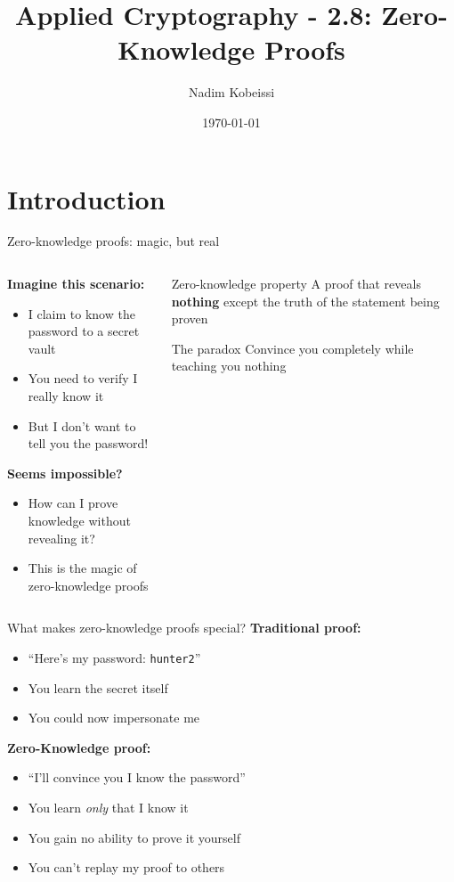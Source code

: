 \documentclass[aspectratio=169, lualatex, handout]{beamer}
\title{Applied Cryptography - 2.8: Zero-Knowledge Proofs}
\author{Nadim Kobeissi}
\institute{American University of Beirut}
\date{\today}
\begin{document}
\begin{frame}[plain]
	\titlepage
\end{frame}

\section{Introduction}

\begin{frame}{Zero-knowledge proofs: magic, but real}
	\begin{columns}[c]
		\begin{column}{0.5\textwidth}
			\textbf{Imagine this scenario:}
			\begin{itemize}
				\item I claim to know the password to a secret vault
				\item You need to verify I really know it
				\item But I don't want to tell you the password!
			\end{itemize}
			\textbf{Seems impossible?}
			\begin{itemize}
				\item How can I prove knowledge without revealing it?
				\item This is the magic of zero-knowledge proofs
			\end{itemize}
		\end{column}
		\begin{column}{0.5\textwidth}
			\begin{block}{Zero-knowledge property}
				A proof that reveals \textbf{nothing} except the truth of the statement being proven
			\end{block}
			\vspace{0.5em}
			\begin{alertblock}{The paradox}
				Convince you completely while teaching you nothing
			\end{alertblock}
		\end{column}
	\end{columns}
\end{frame}

\begin{frame}{What makes zero-knowledge proofs special?}
	\textbf{Traditional proof:}
	\begin{itemize}
		\item ``Here's my password: \texttt{hunter2}''
		\item You learn the secret itself
		\item You could now impersonate me
	\end{itemize}
	\textbf{Zero-Knowledge proof:}
	\begin{itemize}
		\item ``I'll convince you I know the password''
		\item You learn \textit{only} that I know it
		\item You gain no ability to prove it yourself
		\item You can't replay my proof to others
	\end{itemize}
\end{frame}
\end{document}
